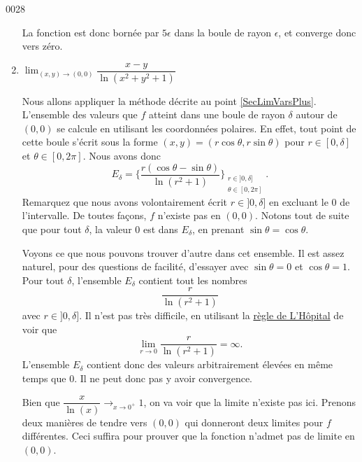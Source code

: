 \begin{corrige}{0028}
\begin{enumerate}
\begin{alternative}
La fonction est donc bornée par $5\epsilon$ dans la boule de rayon $\epsilon$, et converge donc vers zéro.
\end{alternative}



\item   $\lim_{(x,y)\rightarrow (0,0)} \dfrac{x-y}{\ln(x^2+y^2+1)}$
																	    
Nous allons appliquer la méthode décrite au point \ref{SecLimVarsPlus}. L'ensemble des valeurs que $f$ atteint dans une boule de rayon $\delta$ autour de $(0,0)$ se calcule en utilisant les coordonnées polaires. En effet, tout point de cette boule s'écrit sous la forme $(x,y)=(r\cos\theta,r\sin\theta)$ pour $r\in[0,\delta]$ et $\theta\in[0,2\pi]$. Nous avons donc
\begin{equation}
	E_{\delta}=\big\{  \frac{ r(\cos\theta-\sin\theta) }{ \ln(r^2+1) } \big\}_{\substack{r\in]0,\delta]\\\theta\in[0,2\pi]}}.
\end{equation}
Remarquez que nous avons volontairement écrit $r\in]0,\delta]$ en excluant le $0$ de l'intervalle. De toutes façons, $f$ n'existe pas en $(0,0)$. Notons tout de suite que pour tout $\delta$, la valeur $0$ est dans $E_{\delta}$, en prenant $\sin\theta=\cos\theta$.

Voyons ce que nous pouvons trouver d'autre dans cet ensemble. Il est assez naturel, pour des questions de facilité, d'essayer avec $\sin\theta=0$ et $\cos\theta=1$. Pour tout $\delta$, l'ensemble $E_{\delta}$ contient tout les nombres
\begin{equation}
	\frac{ r }{ \ln(r^2+1) }
\end{equation}
avec $r\in]0,\delta]$. Il n'est pas très difficile, en utilisant la \href{http://fr.wikipedia.org/wiki/Règle_de_L'Hôpital}{règle de L'Hôpital} de voir que 
\begin{equation}
	\lim_{r\to 0}\frac{ r }{ \ln(r^2+1) }=\infty.
\end{equation}
L'ensemble $E_{\delta}$ contient donc des valeurs arbitrairement élevées en même temps que $0$. Il ne peut donc pas y avoir convergence.


\begin{alternative}
	
	Bien que 	$\dfrac{x}{\ln(x)} \longrightarrow_{x\rightarrow 0^+}1$, on va voir que la limite n'existe pas ici. Prenons deux	 	manières de tendre vers $(0,0)$ qui donneront deux limites pour $f$ différentes. Ceci suffira pour prouver que la fonction n'admet pas de limite en $(0,0)$.


\end{alternative}
\end{enumerate}
\end{corrige}
